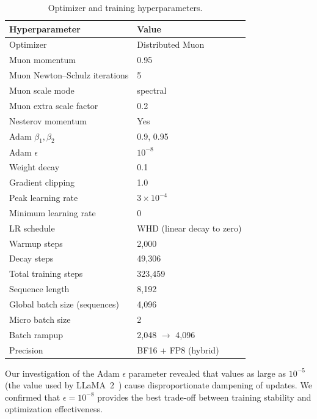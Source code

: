 \documentclass[11pt,a4paper]{article}
\newcommand{\tableheadercolor}{}
\begin{document}
\begin{table}[H]
  \centering
  \caption{Optimizer and training hyperparameters.}
  \label{tab:hyperparams}
  \small
  \begin{tabular}{@{}ll@{}}
    \toprule
    \tableheadercolor
    \textbf{Hyperparameter} & \textbf{Value} \\
    \midrule
    Optimizer                      & Distributed Muon \\
    Muon momentum                  & 0.95 \\
    Muon Newton--Schulz iterations & 5 \\
    Muon scale mode                & spectral \\
    Muon extra scale factor        & 0.2 \\
    Nesterov momentum              & Yes \\
    Adam $\beta_1, \beta_2$        & 0.9, 0.95 \\
    Adam $\epsilon$                & $10^{-8}$ \\
    Weight decay                   & 0.1 \\
    Gradient clipping              & 1.0 \\
    Peak learning rate             & $3 \times 10^{-4}$ \\
    Minimum learning rate          & 0 \\
    LR schedule                    & WHD (linear decay to zero) \\
    Warmup steps                   & 2{,}000 \\
    Decay steps                    & 49{,}306 \\
    Total training steps           & 323{,}459 \\
    Sequence length                & 8{,}192 \\
    Global batch size (sequences)  & 4{,}096 \\
    Micro batch size               & 2 \\
    Batch rampup                   & 2{,}048 $\to$ 4{,}096 \\
    Precision                      & BF16 + FP8 (hybrid) \\
    \bottomrule
  \end{tabular}
\end{table}

Our investigation of the Adam $\epsilon$ parameter revealed that values as large as
$10^{-5}$ (the value used by LLaMA~2~\cite{touvron2023llama2}) cause disproportionate dampening of
updates. We confirmed that $\epsilon = 10^{-8}$ provides the best trade-off between
training stability and optimization effectiveness.
\end{document}
